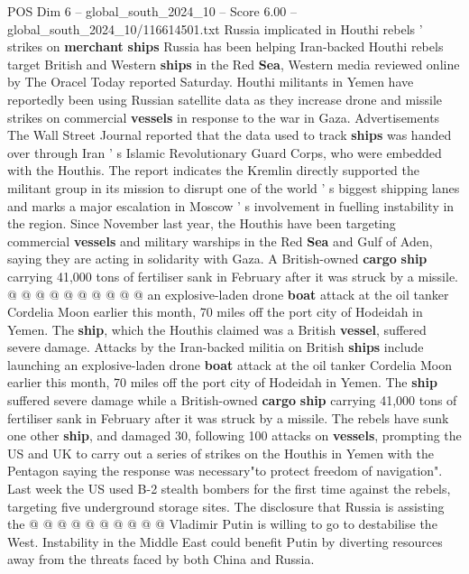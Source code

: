 \begin{textsample}{POS Dim 6 – global\_south\_2024\_10 – Score 6.00 – global\_south\_2024\_10/116614501.txt}  \label{ex:f6_pos_416}
Russia implicated in Houthi rebels ' strikes on \textbf{merchant} \textbf{ships} Russia has been helping Iran-backed Houthi rebels target British and Western \textbf{ships} in the Red \textbf{Sea}, Western media reviewed online by The Oracel Today reported Saturday.
Houthi militants in Yemen have reportedly been using Russian satellite data as they increase drone and missile strikes on commercial \textbf{vessels} in response to the war in Gaza.
Advertisements The Wall Street Journal reported that the data used to track \textbf{ships} was handed over through Iran ' s Islamic Revolutionary Guard Corps, who were embedded with the Houthis.
The report indicates the Kremlin directly supported the militant group in its mission to disrupt one of the world ' s biggest shipping lanes and marks a major escalation in Moscow ' s involvement in fuelling instability in the region.
Since November last year, the Houthis have been targeting commercial \textbf{vessels} and military warships in the Red \textbf{Sea} and Gulf of Aden, saying they are acting in solidarity with Gaza.
A British-owned \textbf{cargo} \textbf{ship} carrying 41,000 tons of fertiliser sank in February after it was struck by a missile. @ @ @ @ @ @ @ @ @ @ an explosive-laden drone \textbf{boat} attack at the oil tanker Cordelia Moon earlier this month, 70 miles off the port city of Hodeidah in Yemen.
The \textbf{ship}, which the Houthis claimed was a British \textbf{vessel}, suffered severe damage.
Attacks by the Iran-backed militia on British \textbf{ships} include launching an explosive-laden drone \textbf{boat} attack at the oil tanker Cordelia Moon earlier this month, 70 miles off the port city of Hodeidah in Yemen.
The \textbf{ship} suffered severe damage while a British-owned \textbf{cargo} \textbf{ship} carrying 41,000 tons of fertiliser sank in February after it was struck by a missile.
The rebels have sunk one other \textbf{ship}, and damaged 30, following 100 attacks on \textbf{vessels}, prompting the US and UK to carry out a series of strikes on the Houthis in Yemen with the Pentagon saying the response was necessary"to protect freedom of navigation".
Last week the US used B-2 stealth bombers for the first time against the rebels, targeting five underground storage sites.
The disclosure that Russia is assisting the @ @ @ @ @ @ @ @ @ @ Vladimir Putin is willing to go to destabilise the West.
Instability in the Middle East could benefit Putin by diverting resources away from the threats faced by both China and Russia.

\end{textsample}
